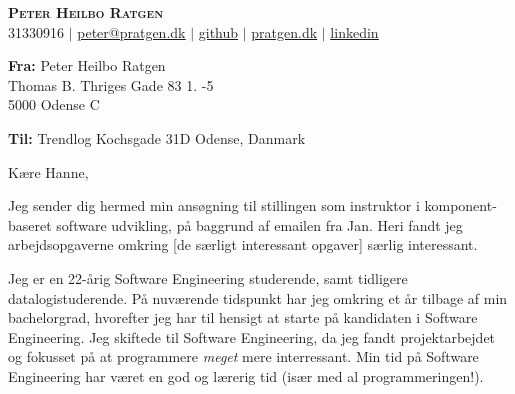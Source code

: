 \documentclass{article}
\begin{document}
\begin{center}
  \textbf{\huge{\scshape{Peter Heilbo Ratgen}}}\\ 
  \vspace{0.2cm}
  \small 31330916 $|$
  \href{mailto:peter@pratgen.dk}{\underline{peter@pratgen.dk}} $|$
  \href{https://github.com/PeterRatgen }{\underline{github}} $|$
  \href{https://pratgen.dk}{\underline{pratgen.dk}} $|$
  \href{https://www.linkedin.com/in/peter-ratgen-a1236529/}{\underline{linkedin}}
\end{center}
\vspace{0.25cm}
\begin{flushright}
\begin{minipage}{.45\linewidth}
    \begin{flushleft}
    \textbf{Fra: }\newline
    Peter Heilbo Ratgen \\
    Thomas B. Thriges Gade 83 1. -5 \\
    5000 Odense C
    \end{flushleft}
\end{minipage}
\end{flushright}
\begin{flushleft}
\textbf{Til:}\newline
Trendlog\newline
Kochsgade 31D  Odense, Danmark 
\end{flushleft}
\vspace{0.5cm}

Kære Hanne, \vspace{\baselineskip}

Jeg sender dig hermed min ansøgning til stillingen som instruktor i
komponent-baseret software udvikling, på
baggrund af emailen fra Jan.  Heri fandt jeg arbejdsopgaverne
omkring [de særligt interessant opgaver] særlig interessant. \vspace{\baselineskip}

Jeg er en 22-årig Software Engineering studerende, samt tidligere
datalogistuderende. På nuværende tidspunkt har jeg omkring et år tilbage
af min bachelorgrad, hvorefter jeg har til hensigt at starte på kandidaten i
Software Engineering. Jeg skiftede til Software Engineering, da jeg fandt
projektarbejdet og fokusset på at programmere \textit{meget} mere interressant.
Min tid på Software Engineering har været en god og lærerig tid (især med al
programmeringen!).\vspace{\baselineskip}
\end{document}
